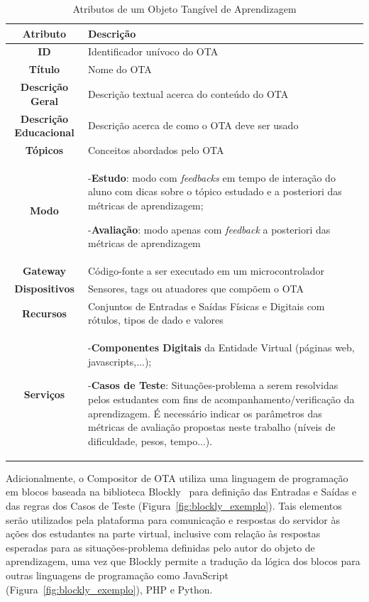 \begin{table}[htb]
\caption{Atributos de um Objeto Tangível de Aprendizagem}
\centering

\begin{tabularx}{\textwidth}{|c|X|}
\hline
\textbf{Atributo} & \textbf{Descrição} \\ \hline
\textbf{ID} & Identificador unívoco do OTA \\ \hline
\textbf{Título} & Nome do OTA \\ \hline
\textbf{Descrição Geral} & Descrição textual acerca do conteúdo do OTA \\ \hline
\textbf{Descrição Educacional} & Descrição acerca de como o OTA deve ser usado \\ \hline
\textbf{Tópicos} & Conceitos abordados pelo OTA \\ \hline
\textbf{Modo} & -\textbf{Estudo}: modo com \textit{feedbacks} em tempo de interação do aluno com dicas sobre o tópico estudado e a posteriori das métricas de aprendizagem;

	-\textbf{Avaliação}: modo apenas com \textit{feedback} a posteriori das métricas de aprendizagem\\ \hline
\textbf{Gateway} & Código-fonte a ser executado em um microcontrolador\\ \hline
\textbf{Dispositivos} & Sensores, tags ou atuadores que compõem o OTA\\ \hline
\textbf{Recursos} & Conjuntos de Entradas e Saídas Físicas e Digitais com rótulos, tipos de dado e valores\\ \hline
\textbf{Serviços} &  -\textbf{Componentes Digitais} da Entidade Virtual (páginas web, javascripts,...); 

-\textbf{Casos de Teste}: Situações-problema a serem resolvidas pelos estudantes com fins de acompanhamento/verificação da aprendizagem. É necessário indicar os parâmetros das métricas de avaliação propostas neste trabalho (níveis de dificuldade, pesos, tempo...). \\ \hline
\end{tabularx}
\label{tabela:OFV}
\end{table}

Adicionalmente, o Compositor de OTA utiliza uma linguagem de programação em blocos baseada na biblioteca Blockly~\citep{Blockly:2022} para definição das Entradas e Saídas e das regras dos Casos de Teste (Figura~\ref{fig:blockly_exemplo}). Tais elementos serão utilizados pela plataforma para comunicação e respostas do servidor às ações dos estudantes na parte virtual, inclusive com relação às respostas esperadas para as situações-problema definidas pelo autor do objeto de aprendizagem, uma vez que Blockly permite a tradução da lógica dos blocos para outras linguagens de programação como JavaScript (Figura~\ref{fig:blockly_exemplo}), PHP e Python.

